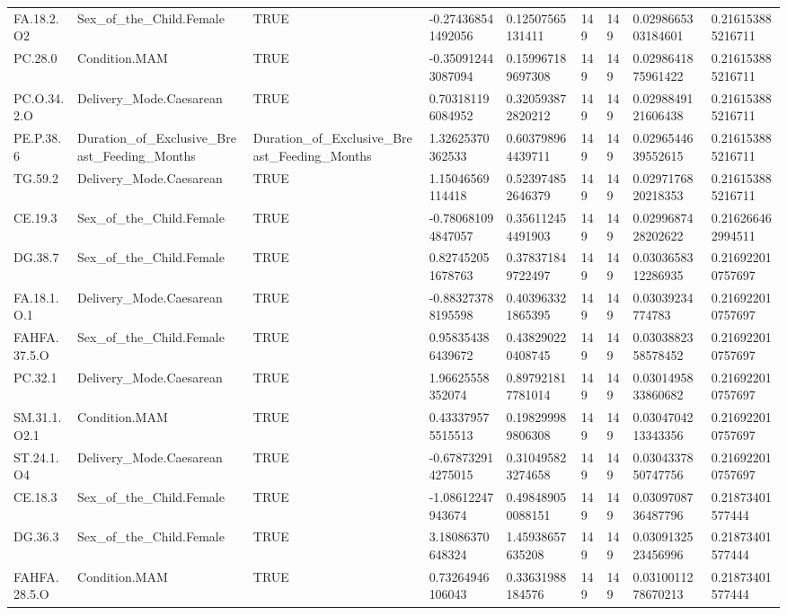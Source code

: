 \begin{longtable}{lllllllll}
FA.18.2.O2 & Sex\_of\_the\_Child.Female & TRUE & -0.274368541492056 & 0.12507565131411 & 149 & 149 & 0.0298665303184601 & 0.216153885216711 \\
PC.28.0 & Condition.MAM & TRUE & -0.350912443087094 & 0.159967189697308 & 149 & 149 & 0.0298641875961422 & 0.216153885216711 \\
PC.O.34.2.O & Delivery\_Mode.Caesarean & TRUE & 0.703181196084952 & 0.320593872820212 & 149 & 149 & 0.0298849121606438 & 0.216153885216711 \\
PE.P.38.6 & Duration\_of\_Exclusive\_Breast\_Feeding\_Months & Duration\_of\_Exclusive\_Breast\_Feeding\_Months & 1.32625370362533 & 0.603798964439711 & 149 & 149 & 0.0296544639552615 & 0.216153885216711 \\
TG.59.2 & Delivery\_Mode.Caesarean & TRUE & 1.15046569114418 & 0.523974852646379 & 149 & 149 & 0.0297176820218353 & 0.216153885216711 \\
CE.19.3 & Sex\_of\_the\_Child.Female & TRUE & -0.780681094847057 & 0.356112454491903 & 149 & 149 & 0.0299687428202622 & 0.216266462994511 \\
DG.38.7 & Sex\_of\_the\_Child.Female & TRUE & 0.827452051678763 & 0.378371849722497 & 149 & 149 & 0.0303658312286935 & 0.216922010757697 \\
FA.18.1.O.1 & Delivery\_Mode.Caesarean & TRUE & -0.883273788195598 & 0.403963321865395 & 149 & 149 & 0.03039234774783 & 0.216922010757697 \\
FAHFA.37.5.O & Sex\_of\_the\_Child.Female & TRUE & 0.958354386439672 & 0.438290220408745 & 149 & 149 & 0.0303882358578452 & 0.216922010757697 \\
PC.32.1 & Delivery\_Mode.Caesarean & TRUE & 1.96625558352074 & 0.897921817781014 & 149 & 149 & 0.0301495833860682 & 0.216922010757697 \\
SM.31.1.O2.1 & Condition.MAM & TRUE & 0.433379575515513 & 0.198299989806308 & 149 & 149 & 0.0304704213343356 & 0.216922010757697 \\
ST.24.1.O4 & Delivery\_Mode.Caesarean & TRUE & -0.678732914275015 & 0.310495823274658 & 149 & 149 & 0.0304337850747756 & 0.216922010757697 \\
CE.18.3 & Sex\_of\_the\_Child.Female & TRUE & -1.08612247943674 & 0.498489050088151 & 149 & 149 & 0.0309708736487796 & 0.21873401577444 \\
DG.36.3 & Sex\_of\_the\_Child.Female & TRUE & 3.18086370648324 & 1.45938657635208 & 149 & 149 & 0.0309132523456996 & 0.21873401577444 \\
FAHFA.28.5.O & Condition.MAM & TRUE & 0.73264946106043 & 0.33631988184576 & 149 & 149 & 0.0310011278670213 & 0.21873401577444 \\

\end{longtable}
